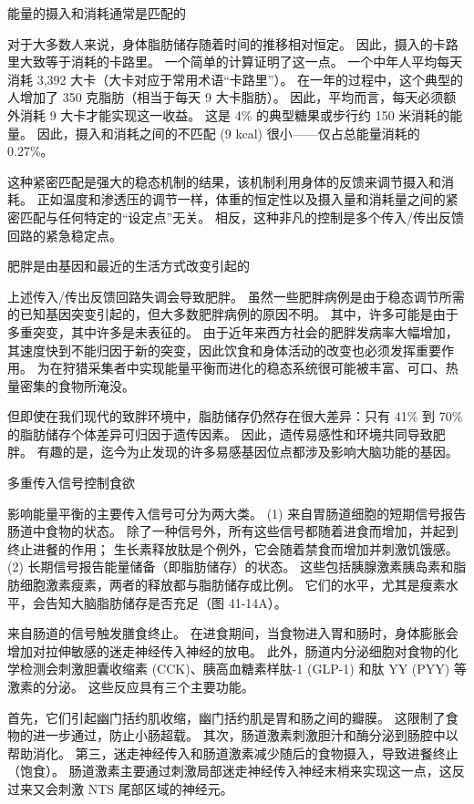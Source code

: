 能量的摄入和消耗通常是匹配的

对于大多数人来说，身体脂肪储存随着时间的推移相对恒定。 因此，摄入的卡路里大致等于消耗的卡路里。 一个简单的计算证明了这一点。 一个中年人平均每天消耗 3,392 大卡（大卡对应于常用术语“卡路里”）。 在一年的过程中，这个典型的人增加了 350 克脂肪（相当于每天 9 大卡脂肪）。 因此，平均而言，每天必须额外消耗 9 大卡才能实现这一收益。 这是 4\% 的典型糖果或步行约 150 米消耗的能量。 因此，摄入和消耗之间的不匹配 (9 kcal) 很小——仅占总能量消耗的 0.27\%。

这种紧密匹配是强大的稳态机制的结果，该机制利用身体的反馈来调节摄入和消耗。 正如温度和渗透压的调节一样，体重的恒定性以及摄入量和消耗量之间的紧密匹配与任何特定的“设定点”无关。 相反，这种非凡的控制是多个传入/传出反馈回路的紧急稳定点。

肥胖是由基因和最近的生活方式改变引起的

上述传入/传出反馈回路失调会导致肥胖。 虽然一些肥胖病例是由于稳态调节所需的已知基因突变引起的，但大多数肥胖病例的原因不明。 其中，许多可能是由于多重突变，其中许多是未表征的。 由于近年来西方社会的肥胖发病率大幅增加，其速度快到不能归因于新的突变，因此饮食和身体活动的改变也必须发挥重要作用。 为在狩猎采集者中实现能量平衡而进化的稳态系统很可能被丰富、可口、热量密集的食物所淹没。

但即使在我们现代的致胖环境中，脂肪储存仍然存在很大差异：只有 41\% 到 70\% 的脂肪储存个体差异可归因于遗传因素。 因此，遗传易感性和环境共同导致肥胖。 有趣的是，迄今为止发现的许多易感基因位点都涉及影响大脑功能的基因。

多重传入信号控制食欲

影响能量平衡的主要传入信号可分为两大类。 (1) 来自胃肠道细胞的短期信号报告肠道中食物的状态。 除了一种信号外，所有这些信号都随着进食而增加，并起到终止进餐的作用； 生长素释放肽是个例外，它会随着禁食而增加并刺激饥饿感。 (2) 长期信号报告能量储备（即脂肪储存）的状态。 这些包括胰腺激素胰岛素和脂肪细胞激素瘦素，两者的释放都与脂肪储存成比例。 它们的水平，尤其是瘦素水平，会告知大脑脂肪储存是否充足（图 41-14A）。

来自肠道的信号触发膳食终止。 在进食期间，当食物进入胃和肠时，身体膨胀会增加对拉伸敏感的迷走神经传入神经的放电。 此外，肠道内分泌细胞对食物的化学检测会刺激胆囊收缩素 (CCK)、胰高血糖素样肽-1 (GLP-1) 和肽 YY (PYY) 等激素的分泌。 这些反应具有三个主要功能。

首先，它们引起幽门括约肌收缩，幽门括约肌是胃和肠之间的瓣膜。 这限制了食物的进一步通过，防止小肠超载。 其次，肠道激素刺激胆汁和酶分泌到肠腔中以帮助消化。 第三，迷走神经传入和肠道激素减少随后的食物摄入，导致进餐终止（饱食）。 肠道激素主要通过刺激局部迷走神经传入神经末梢来实现这一点，这反过来又会刺激 NTS 尾部区域的神经元。


